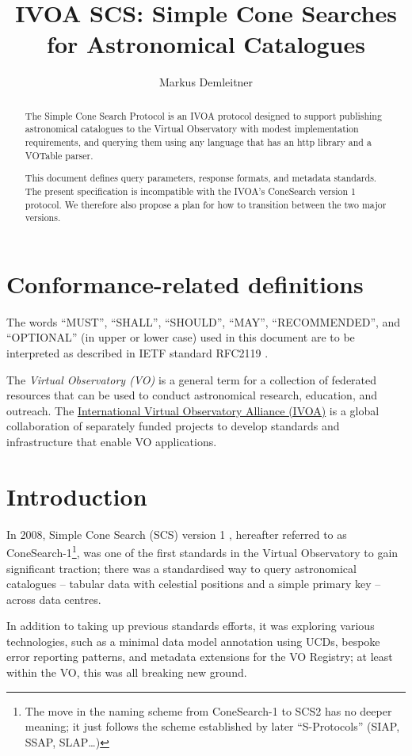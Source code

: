 \documentclass[11pt,a4paper]{ivoa}
\title{IVOA SCS: Simple Cone Searches for Astronomical Catalogues}
\author[https://wiki.ivoa.net/twiki/bin/view/IVOA/MarkusDemleitner]{
  Markus Demleitner}
\begin{document}
\begin{abstract}
The Simple Cone Search Protocol is an IVOA protocol designed to support
publishing astronomical catalogues to the Virtual Observatory with
modest implementation requirements, and querying them using any language
that has an http library and a VOTable parser.  

This document defines query parameters, response formats, and metadata
standards.  The present specification is incompatible with the IVOA's
ConeSearch version 1 protocol.  We therefore also propose a plan for how
to transition between the two major versions.

\end{abstract}


\section*{Conformance-related definitions}

The words ``MUST'', ``SHALL'', ``SHOULD'', ``MAY'', ``RECOMMENDED'', and
``OPTIONAL'' (in upper or lower case) used in this document are to be
interpreted as described in IETF standard RFC2119 \citep{std:RFC2119}.

The \emph{Virtual Observatory (VO)} is a
general term for a collection of federated resources that can be used
to conduct astronomical research, education, and outreach.
The \href{https://www.ivoa.net}{International
Virtual Observatory Alliance (IVOA)} is a global
collaboration of separately funded projects to develop standards and
infrastructure that enable VO applications.


\section{Introduction}

In 2008, Simple Cone Search (SCS) version 1 \citep{2008ivoa.specQ0222P}, 
hereafter referred to as ConeSearch-1\footnote{The move in the naming
scheme from ConeSearch-1 to SCS2 has no deeper meaning; it just follows
the scheme established by later ``S-Protocols'' (SIAP, SSAP, SLAP\dots)},
was one of the first standards in the Virtual Observatory to gain
significant traction; there was a standardised way to query astronomical
catalogues -- tabular data with celestial positions and a simple primary
key -- across data centres.

In addition to taking up previous standards efforts, it was exploring
various technologies, such as a minimal data model annotation using UCDs,
bespoke error reporting patterns, and metadata extensions for the VO
Registry; at least within the VO, this was all breaking new ground.
\end{document}
